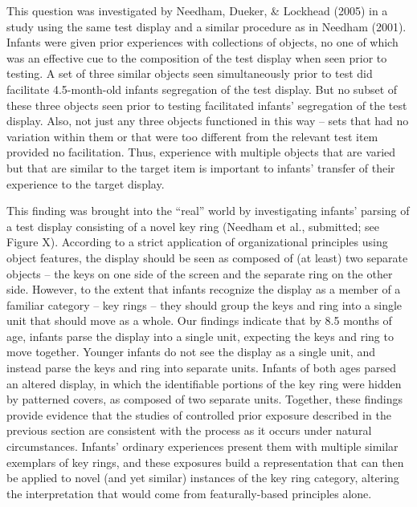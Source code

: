 This question was investigated by Needham, Dueker, \& Lockhead (2005)
in a study using the same test display and a similar procedure as in
Needham (2001).  Infants were given prior experiences with collections
of objects, no one of which was an effective cue to the composition of
the test display when seen prior to testing.  A set of three similar
objects seen simultaneously prior to test did facilitate 4.5-month-old
infants segregation of the test display.  But no subset of these three
objects seen prior to testing facilitated infants' segregation
of the test display.  Also, not just any three objects functioned in
this way -- sets that had no variation within them or that were
too different from the relevant test item provided no facilitation.
Thus, experience with multiple objects that are varied but that are
similar to the target item is important to infants' transfer
of their experience to the target display.



This finding was brought into the ``real'' world by investigating
infants' parsing of a test display consisting of a novel key
ring (Needham et al., submitted; see Figure X).  According to a strict
application of organizational principles using object features, the
display should be seen as composed of (at least) two separate
objects -- the keys on one side of the screen and the separate
ring on the other side.  However, to the extent that infants recognize
the display as a member of a familiar category -- key
rings -- they should group the keys and ring into a single unit
that should move as a whole.  Our findings indicate that by 8.5 months
of age, infants parse the display into a single unit, expecting the
keys and ring to move together.  Younger infants do not see the
display as a single unit, and instead parse the keys and ring into
separate units.  Infants of both ages parsed an altered display, in
which the identifiable portions of the key ring were hidden by
patterned covers, as composed of two separate units.  Together, these
findings provide evidence that the studies of controlled prior
exposure described in the previous section are consistent with the
process as it occurs under natural circumstances.  Infants'
ordinary experiences present them with multiple similar exemplars of
key rings, and these exposures build a representation that can then be
applied to novel (and yet similar) instances of the key ring category,
altering the interpretation that would come from featurally-based
principles alone.



